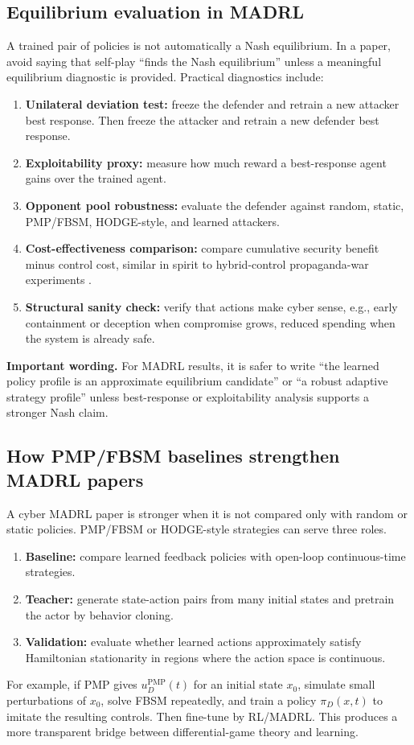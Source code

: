 \documentclass[11pt,a4paper]{article}
\begin{document}
\subsection{Equilibrium evaluation in MADRL}
A trained pair of policies is not automatically a Nash equilibrium. In a paper, avoid saying that self-play ``finds the Nash equilibrium'' unless a meaningful equilibrium diagnostic is provided. Practical diagnostics include:
\begin{enumerate}
\item \textbf{Unilateral deviation test:} freeze the defender and retrain a new attacker best response. Then freeze the attacker and retrain a new defender best response.
\item \textbf{Exploitability proxy:} measure how much reward a best-response agent gains over the trained agent.
\item \textbf{Opponent pool robustness:} evaluate the defender against random, static, PMP/FBSM, HODGE-style, and learned attackers.
\item \textbf{Cost-effectiveness comparison:} compare cumulative security benefit minus control cost, similar in spirit to hybrid-control propaganda-war experiments \cite{cheng2024propaganda}.
\item \textbf{Structural sanity check:} verify that actions make cyber sense, e.g., early containment or deception when compromise grows, reduced spending when the system is already safe.
\end{enumerate}

\begin{boxednote}
\textbf{Important wording.}
For MADRL results, it is safer to write ``the learned policy profile is an approximate equilibrium candidate'' or ``a robust adaptive strategy profile'' unless best-response or exploitability analysis supports a stronger Nash claim.
\end{boxednote}

\subsection{How PMP/FBSM baselines strengthen MADRL papers}
A cyber MADRL paper is stronger when it is not compared only with random or static policies. PMP/FBSM or HODGE-style strategies can serve three roles.
\begin{enumerate}
\item \textbf{Baseline:} compare learned feedback policies with open-loop continuous-time strategies.
\item \textbf{Teacher:} generate state-action pairs from many initial states and pretrain the actor by behavior cloning.
\item \textbf{Validation:} evaluate whether learned actions approximately satisfy Hamiltonian stationarity in regions where the action space is continuous.
\end{enumerate}
For example, if PMP gives $u_D^{\mathrm{PMP}}(t)$ for an initial state $x_0$, simulate small perturbations of $x_0$, solve FBSM repeatedly, and train a policy $\pi_D(x,t)$ to imitate the resulting controls. Then fine-tune by RL/MADRL. This produces a more transparent bridge between differential-game theory and learning.
\end{document}
